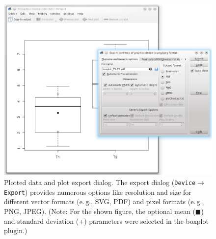 \begin{figure}[t!]
 \centering
 \includegraphics[width=14.5cm]{./figures/boxplot2.png}
 \caption{Plotted data and plot export dialog. The export dialog (\texttt{Device$\rightarrow$Export}) provides numerous 
  options like resolution and size for different vector formats (e.\,g., SVG, PDF) and 
  pixel formats (e.\,g., PNG, JPEG). (Note: For the shown figure, the optional  
  mean ($\blacksquare$) and standard deviation ($+$) parameters were selected in the boxplot plugin.)}
 \label{fig:boxplot2}
\end{figure}

\newpage
